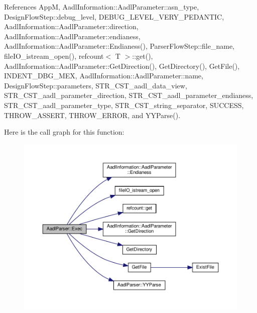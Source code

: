 References AppM, Aadl\+Information\+::\+Aadl\+Parameter\+::asn\+\_\+type, Design\+Flow\+Step\+::debug\+\_\+level, D\+E\+B\+U\+G\+\_\+\+L\+E\+V\+E\+L\+\_\+\+V\+E\+R\+Y\+\_\+\+P\+E\+D\+A\+N\+T\+IC, Aadl\+Information\+::\+Aadl\+Parameter\+::direction, Aadl\+Information\+::\+Aadl\+Parameter\+::endianess, Aadl\+Information\+::\+Aadl\+Parameter\+::\+Endianess(), Parser\+Flow\+Step\+::file\+\_\+name, file\+I\+O\+\_\+istream\+\_\+open(), refcount$<$ T $>$\+::get(), Aadl\+Information\+::\+Aadl\+Parameter\+::\+Get\+Direction(), Get\+Directory(), Get\+File(), I\+N\+D\+E\+N\+T\+\_\+\+D\+B\+G\+\_\+\+M\+EX, Aadl\+Information\+::\+Aadl\+Parameter\+::name, Design\+Flow\+Step\+::parameters, S\+T\+R\+\_\+\+C\+S\+T\+\_\+aadl\+\_\+data\+\_\+view, S\+T\+R\+\_\+\+C\+S\+T\+\_\+aadl\+\_\+parameter\+\_\+direction, S\+T\+R\+\_\+\+C\+S\+T\+\_\+aadl\+\_\+parameter\+\_\+endianess, S\+T\+R\+\_\+\+C\+S\+T\+\_\+aadl\+\_\+parameter\+\_\+type, S\+T\+R\+\_\+\+C\+S\+T\+\_\+string\+\_\+separator, S\+U\+C\+C\+E\+SS, T\+H\+R\+O\+W\+\_\+\+A\+S\+S\+E\+RT, T\+H\+R\+O\+W\+\_\+\+E\+R\+R\+OR, and Y\+Y\+Parse().

Here is the call graph for this function\+:
\nopagebreak
\begin{figure}[H]
\begin{center}
\leavevmode
\includegraphics[width=350pt]{db/daa/classAadlParser_aded0aad8f9b66318957f0df1d027256b_cgraph}
\end{center}
\end{figure}
\mbox{\label{classAadlParser_acecaf8ee4223f68c15c7d8087b09e544}} 
